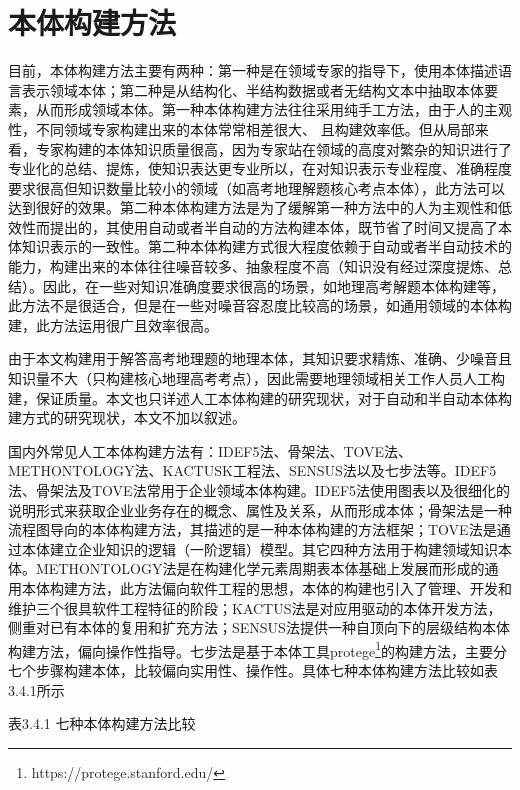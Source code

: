 \section{本体构建方法}
目前，本体构建方法\cite{yue}主要有两种：第一种是在领域专家的指导下，使用本体描述语言表示领域本体；第二种是从结构化、半结构数据或者无结构文本中抽取本体要素，从而形成领域本体。第一种本体构建方法往往采用纯手工方法，由于人的主观性，不同领域专家构建出来的本体常常相差很大、
且构建效率低。但从局部来看，专家构建的本体知识质量很高，因为专家站在领域的高度对繁杂的知识进行了专业化的总结、提炼，使知识表达更专业所以，在对知识表示专业程度、准确程度要求很高但知识数量比较小的领域（如高考地理解题核心考点本体），此方法可以达到很好的效果。第二种本体构建方法是为了缓解第一种方法中的人为主观性和低效性而提出的，其使用自动或者半自动的方法构建本体，既节省了时间又提高了本体知识表示的一致性。第二种本体构建方式很大程度依赖于自动或者半自动技术的能力，构建出来的本体往往噪音较多、抽象程度不高（知识没有经过深度提炼、总结）。因此，在一些对知识准确度要求很高的场景，如地理高考解题本体构建等，此方法不是很适合，但是在一些对噪音容忍度比较高的场景，如通用领域的本体构建，此方法运用很广且效率很高。

由于本文构建用于解答高考地理题的地理本体，其知识要求精炼、准确、少噪音且知识量不大（只构建核心地理高考考点），因此需要地理领域相关工作人员人工构建，保证质量。本文也只详述人工本体构建的研究现状，对于自动和半自动本体构建方式的研究现状，本文不加以叙述。

国内外常见人工本体构建方法有：IDEF5法\cite{IDEF5}、骨架法\cite{skelton}、TOVE法\cite{TOVE}、METHONTOLOGY法\cite{METHONTOLOGY}、KACTUSK工程法\cite{KACTUSK,KACTUSK2}、SENSUS法\cite{SENSUS}以及七步法\cite{seven}等。IDEF5法、骨架法及TOVE法常用于企业领域本体构建。IDEF5法使用图表以及很细化的说明形式来获取企业业务存在的概念、属性及关系，从而形成本体；骨架法是一种流程图导向的本体构建方法，其描述的是一种本体构建的方法框架；TOVE法是通过本体建立企业知识的逻辑（一阶逻辑）模型。其它四种方法用于构建领域知识本体。METHONTOLOGY法是在构建化学元素周期表本体基础上发展而形成的通用本体构建方法，此方法偏向软件工程的思想，本体的构建也引入了管理、开发和维护三个很具软件工程特征的阶段；KACTUS法是对应用驱动的本体开发方法，侧重对已有本体的复用和扩充方法；SENSUS法提供一种自顶向下的层级结构本体构建方法，偏向操作性指导。七步法是基于本体工具protege\footnote{https://protege.stanford.edu/}的构建方法，主要分七个步骤构建本体，比较偏向实用性、操作性。具体七种本体构建方法比较如表3.4.1所示

\begin{center}
	\begin{small}
	表3.4.1 七种本体构建方法比较
	\end{small}

\end{center}

